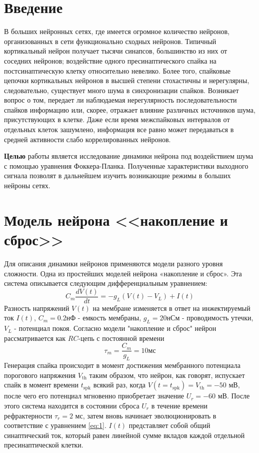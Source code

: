

\def\labauthor{Есюнин Д.В.}
\def\labgroup{0420ДМР1Г}
\def\labtheme{Исследование динамики мембранного потенциала нейрона под воздействием щума с помощью уравнения Фоккера-Планка}

\newpage
\renewcommand{\phi}{\varphi}
\renewcommand{\div}{\text{div}}
\renewcommand{\grad}{\text{grad}}

\section*{Введение}
В больших нейронных сетях, где имеется огромное количество нейронов, организованных в сети функционально сходных нейронов. Типичный кортикальный нейрон получает тысячи синапсов, большинство из них от соседних нейронов; воздействие одного пресинаптического спайка на постсинаптическую клетку относительно невелико. Более того, спайковые цепочки кортикальных нейронов в высшей степени стохастичны и нерегулярны, следовательно, существует много шума в синхронизации спайков. Возникает вопрос о том, передает ли наблюдаемая нерегулярность последовательности спайков информацию или, скорее, отражает влияние различных источников шума, присутствующих в клетке. Даже если время межспайковых интервалов от отдельных клеток зашумлено, информация все равно может передаваться в средней активности слабо коррелированных нейронов. 

\textbf{Целью} работы является исследование динамики нейрона под воздействием шума с помощью уравнения Фоккера-Планка. Полученные характеристики выходного сигнала позволят в дальнейшем изучить возникающие режимы в больших нейроны сетях.
\section{Модель нейрона <<накопление и сброс>>}
Для описания динамики нейронов применяются модели разного уровня сложности. Одна из простейших моделей нейрона «накопление и сброс». Эта система описывается следующим дифференциальным уравнением:
\begin{equation}
	C_m\frac{dV(t)}{dt}=-g_L(V(t)-V_L)+I(t)
	\label{eq:1}
\end{equation}
Разность напряжений $V(t)$ на мембране изменяется в
ответ на инжектируемый ток $I(t)$, $C_m=0.2 нФ$ - емкость мембраны, $g_L=20 нСм$ - проводимость утечки, $V_L$ - потенциал покоя. Согласно модели "накопление и сброс" нейрон рассматривается как $RC$-цепь с постоянной времени
\begin{equation}
	\tau_m=\frac{C_m}{g_L}=10 \text{мс}
	\label{eq:2} 
\end{equation}
Генерация спайка происходит в момент достижения мембранного потенциала порогового напряжения $V_\text{th}$ таким образом, что нейрон, как говорят, испускает спайк в момент времени $t_\text{spk}$ всякий раз, когда 
$V(t=t_\text{spk})=V_\text{th} =-50 \text{ мВ}$, после чего его потенциал мгновенно приобретает значение $U_r=-60 \text{ мВ}$. После этого система находится в состоянии сброса $U_r$ в течение времени рефрактерности $\tau_r=2 \text{ мс}$, затем вновь начинает эволюционировать в соответствие с уравнением \eqref{eq:1}. $I(t)$ представляет собой общий синаптический ток, который равен линейной сумме вкладов каждой отдельной пресинаптической клетки.

